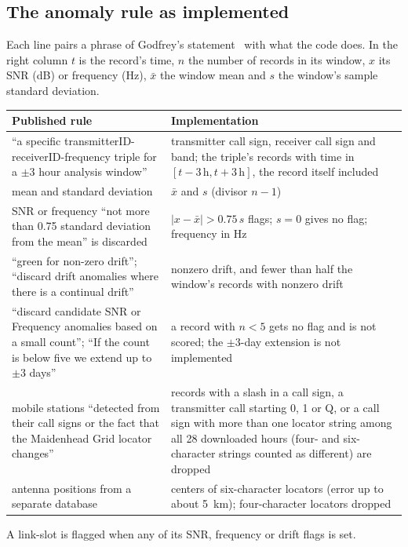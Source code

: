 \documentclass[11pt]{article}
\begin{document}
\begin{appendices}
\section{The anomaly rule as implemented}\label{app:rule}
Each line pairs a phrase of Godfrey's statement~\cite{oefgr} with what the code does. In the right column $t$ is the record's time, $n$ the number of records in its window, $x$ its SNR (dB) or frequency (Hz), $\bar x$ the window mean and $s$ the window's sample standard deviation.

\begin{center}
\small
\begin{tabular}{p{}p{}}
\toprule
Published rule & Implementation \\
\midrule
``a specific transmitterID-receiverID-frequency triple for a $\pm3$ hour analysis window'' & transmitter call sign, receiver call sign and band; the triple's records with time in $[t-3\,\mathrm{h},t+3\,\mathrm{h}]$, the record itself included \\
mean and standard deviation & $\bar x$ and $s$ (divisor $n-1$) \\
SNR or frequency ``not more than 0.75 standard deviation from the mean'' is discarded & $|x-\bar x|>0.75\,s$ flags; $s=0$ gives no flag; frequency in Hz \\
``green for non-zero drift''; ``discard drift anomalies where there is a continual drift'' & nonzero drift, and fewer than half the window's records with nonzero drift \\
``discard candidate SNR or Frequency anomalies based on a small count''; ``If the count is below five we extend up to $\pm3$ days'' & a record with $n<5$ gets no flag and is not scored; the $\pm3$-day extension is not implemented \\
mobile stations ``detected from their call signs or the fact that the Maidenhead Grid locator changes'' & records with a slash in a call sign, a transmitter call starting 0, 1 or Q, or a call sign with more than one locator string among all 28 downloaded hours (four- and six-character strings counted as different) are dropped \\
antenna positions from a separate database & centers of six-character locators (error up to about 5~km); four-character locators dropped \\
\bottomrule
\end{tabular}
\end{center}

A link-slot is flagged when any of its SNR, frequency or drift flags is set.


\end{appendices}
\end{document}
